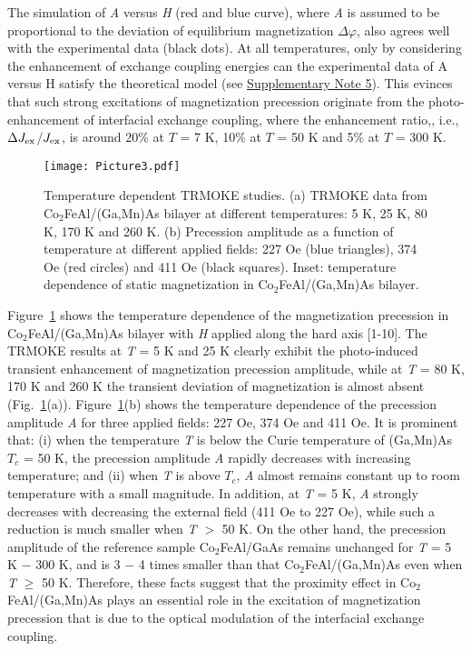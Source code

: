 \documentclass[%
 reprint,
superscriptaddress,
 amsmath,amssymb,
 aps,
prl,
]{revtex4-1}
\begin{document}
The simulation of \textit{A} versus \textit{H} (red and blue curve), where \textit{A} is assumed to be proportional to the deviation of equilibrium magnetization $\Delta\varphi$, also agrees well with the experimental data (black dots). At all temperatures, only by considering the enhancement of exchange coupling energies can the experimental data of A versus H satisfy the theoretical model (see \hyperref[sec:Supplementary]{Supplementary Note 5}). This evinces that such strong excitations of magnetization precession originate from the photo-enhancement of interfacial exchange coupling, where the enhancement ratio,, i.e., $\Delta J_\textup{ex}$/$J_\textup{ex}$, is around 20\% at $T$ = 7 K, 10\% at $T$ = 50 K and 5\% at $T$ = 300 K. 



\begin{figure}
    \centering
    \advance\leftskip-0.8cm
    \advance\rightskip-0cm
    \texttt{[image: Picture3.pdf]}
    \caption{Temperature dependent TRMOKE studies. (a) TRMOKE data from Co$_2$FeAl/(Ga,Mn)As bilayer at different temperatures: 5 K, 25 K, 80 K, 170 K and 260 K. (b) Precession amplitude as a function of temperature at different applied fields: 227 Oe (blue triangles), 374 Oe (red circles) and 411 Oe (black squares). Inset: temperature dependence of static magnetization in Co$_2$FeAl/(Ga,Mn)As bilayer.
}
    \label{fig:Fig3}
\end{figure}

Figure~\ref{fig:Fig3} shows the temperature dependence of the magnetization precession in Co$_2$FeAl/(Ga,Mn)As bilayer with \textit{H} applied along the hard axis [1-10]. The TRMOKE results at \textit{T} = 5 K and 25 K clearly exhibit the photo-induced transient enhancement of magnetization precession amplitude, while at \textit{T} = 80 K, 170 K and 260 K the transient deviation of magnetization is almost absent (Fig.~\ref{fig:Fig3}(a)). Figure~\ref{fig:Fig3}(b) shows the temperature dependence of the precession amplitude \textit{A} for three applied fields: 227 Oe, 374 Oe and 411 Oe. It is prominent that: (i) when the temperature \textit{T} is below the Curie temperature of (Ga,Mn)As $T_{c}$ = 50 K, the precession amplitude \textit{A} rapidly decreases with increasing temperature; and (ii) when \textit{T} is above $T_{c}$, \textit{A} almost remains constant up to room temperature with a small magnitude. In addition, at \textit{T} = 5 K, \textit{A} strongly decreases with decreasing the external field (411 Oe to 227 Oe), while such a reduction is much smaller when \textit{T} $>$ 50 K. On the other hand, the precession amplitude of the reference sample Co$_2$FeAl/GaAs remains unchanged for \textit{T} = 5 K $-$ 300 K, and is 3 $-$ 4 times smaller than that Co$_2$FeAl/(Ga,Mn)As even when \textit{T} $\geqslant$ 50 K. Therefore, these facts suggest that the proximity effect in Co$_2$FeAl/(Ga,Mn)As plays an essential role in the excitation of magnetization precession that is due to the optical modulation of the interfacial exchange coupling.
\end{document}
